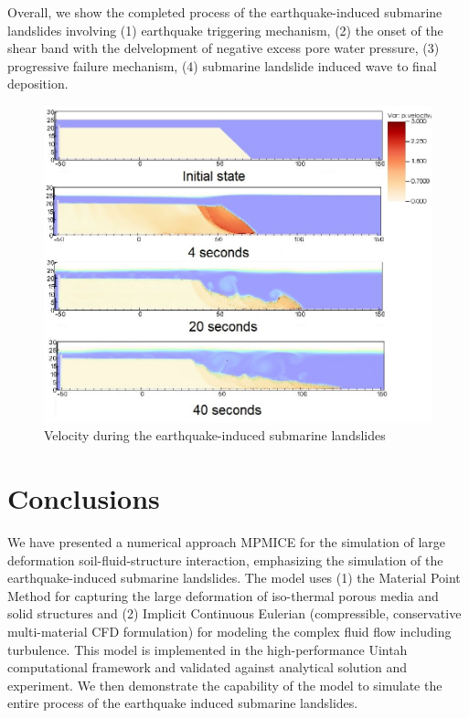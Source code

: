 \documentclass[preprint,12pt]{elsarticle}
\providecommand{\DIFaddbeginFL}{} %
\providecommand{\DIFaddendFL}{} %
\providecommand{\DIFdelbeginFL}{} %
\providecommand{\DIFdelendFL}{} %
\newcommand{\DIFscaledelfig}{0.5}
\newlength{\DIFdelgraphicswidth} %
\newlength{\DIFdelgraphicsheight} %
\newcommand{\DIFaddincludegraphics}[2][]{{\color{blue}\fbox{\DIFOincludegraphics[#1]{#2}}}} %
\newcommand{\DIFdelincludegraphics}[2][]{%
\sbox{\DIFdelgraphicsbox}{\DIFOincludegraphics[#1]{#2}}%
\settoboxwidth{\DIFdelgraphicswidth}{\DIFdelgraphicsbox} %
\settoboxtotalheight{\DIFdelgraphicsheight}{\DIFdelgraphicsbox} %
\scalebox{\DIFscaledelfig}{%
\parbox[b]{\DIFdelgraphicswidth}{\usebox{\DIFdelgraphicsbox}\\[-\baselineskip] \rule{\DIFdelgraphicswidth}{0em}}\llap{\resizebox{\DIFdelgraphicswidth}{\DIFdelgraphicsheight}{%
\setlength{\unitlength}{\DIFdelgraphicswidth}%
\begin{picture}(1,1)%
\thicklines\linethickness{2pt} %
{\color[rgb]{1,0,0}\put(0,0){\framebox(1,1){}}}%
{\color[rgb]{1,0,0}\put(0,0){\line( 1,1){1}}}%
{\color[rgb]{1,0,0}\put(0,1){\line(1,-1){1}}}%
\end{picture}%
}\hspace*{3pt}}} %
} %
\DeclareRobustCommand{\DIFaddbeginFL}{\DIFOaddbeginFL \let\includegraphics\DIFaddincludegraphics} %
\DeclareRobustCommand{\DIFaddendFL}{\DIFOaddendFL \let\includegraphics\DIFOincludegraphics} %
\DeclareRobustCommand{\DIFdelbeginFL}{\DIFOdelbeginFL \let\includegraphics\DIFdelincludegraphics} %
\DeclareRobustCommand{\DIFdelendFL}{\DIFOaddendFL \let\includegraphics\DIFOincludegraphics} %
\begin{document}
%
Overall, we show the completed process of the earthquake-induced submarine landslides involving (1) earthquake triggering mechanism, (2) the onset of the shear band with the delvelopment of negative excess pore water pressure, (3) progressive failure mechanism, (4) submarine landslide induced wave to final deposition.
%
%
\begin{figure}[H]
\center
\DIFdelbeginFL %
\DIFdelendFL \DIFaddbeginFL \includegraphics[scale=0.5]{landslide_vel.jpeg}
\DIFaddendFL \caption{Velocity during the earthquake-induced submarine landslides}
\label{fig:vel}
\end{figure}
%
%
\section{\textsf{Conclusions}}
We have presented a numerical approach MPMICE for the simulation of large deformation soil-fluid-structure interaction, emphasizing the simulation of the earthquake-induced submarine landslides. The model uses (1) the Material Point Method for capturing the large deformation of iso-thermal porous media and solid structures and (2) Implicit Continuous Eulerian (compressible, conservative multi-material CFD formulation) for modeling the complex fluid flow including turbulence. This model is implemented in the high-performance Uintah computational framework and validated against analytical solution and experiment. We then demonstrate the capability of the model to simulate the entire process of the earthquake induced submarine landslides.
\end{document}
